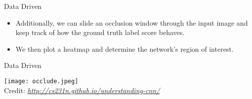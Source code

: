 \begin{frame}{Data Driven}
	\begin{itemize}
		\item Additionally, we can slide an occlusion window through the input image and keep track of how the ground truth label score behaves.
		\item We then plot a heatmap and determine the network's region of interest.
	\end{itemize}
\end{frame}

\begin{frame}{Data Driven}
	\begin{center}
		\texttt{[image: occlude.jpeg]}\\[-1ex]
		{\tiny Credit: {\itshape \url{http://cs231n.github.io/understanding-cnn/}}}
	\end{center}
\end{frame}


